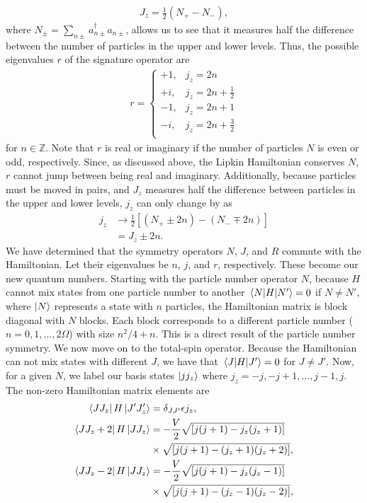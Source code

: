 \documentclass[Dual]{msu-thesis}
\begin{document}
\begin{align}
J_z=\frac{1}{2}(N_+-N_-),
\end{align}
where $N_\pm=\sum_{n\pm}a^\dagger_{n\pm}a_{n\pm}$, allows us to see that it measures half the difference between the number of particles in the upper and lower levels. Thus, the possible eigenvalues $r$ of the signature operator are
\begin{align}
r
=
\begin{cases}
+1, & j_z=2n \\
+i, & j_z=2n+\frac{1}{2} \\
-1, & j_z=2n+1 \\
-i, & j_z=2n+\frac{3}{2} \\
\end{cases}
\end{align}
for $n\in\mathbb{Z}$. Note that $r$ is real or imaginary if the number of particles $N$ is even or odd, respectively. Since, as discussed above, the Lipkin Hamiltonian conserves $N$, $r$ cannot jump between being real and imaginary. Additionally, because particles must be moved in pairs, and $J_z$ measures half the difference between particles in the upper and lower levels, $j_z$ can only change by as
\begin{align}
j_z
&\to
\frac{1}{2}[(N_+\pm 2n)-(N_-\mp 2n)]
\nonumber
\\
&=
J_z\pm2n.
\end{align}
We have determined that the symmetry operators $N$, $J$, and $R$ commute with the Hamiltonian. Let their eigenvalues be $n$, $j$, and $r$, respectively. These become our new quantum numbers. Starting with the particle number operator $N$, because $H$ cannot mix states from one particle number to another $\mel{N}{H}{N'}=0$ if $N\neq N'$, where $\ket{N}$ represents a state with $n$ particles,
the Hamiltonian matrix is block diagonal with $N$ blocks. Each block corresponds to a different particle number ($n=0,1,...,2\Omega$) with size $n^2/4+n$. This is a direct result of the particle number symmetry. We now move on to the total-spin operator. Because the Hamiltonian can not mix states with different $J$, we have that $\mel{J}{H}{J'}=0$ for $J\neq J'$. Now, for a given $N$, we label our basis states $\ket{jj_z}$ where $j_z=-j,-j+1,...,j-1,j$.
The non-zero Hamiltonian matrix elements are
\begin{align}
\bra{JJ_z}H\ket{J'J'_z} 
&=
\delta_{JJ'}\epsilon j_z,
\\
\bra{JJ_z+2}H\ket{JJ_z} &= 
-\frac{V}{2}\sqrt{[j(j+1)-j_z(j_z+1)]}
\nonumber
\\
&\times
\sqrt{[j(j+1)-(j_z+1)(j_z+2)]},
\\
\bra{JJ_z-2}H\ket{JJ_z} &= 
-\frac{V}{2}\sqrt{[j(j+1)-j_z(j_z-1)]}
\nonumber
\\
&\times
\sqrt{[j(j+1)-(j_z-1)(j_z-2)]},
\end{align}
\end{document}
